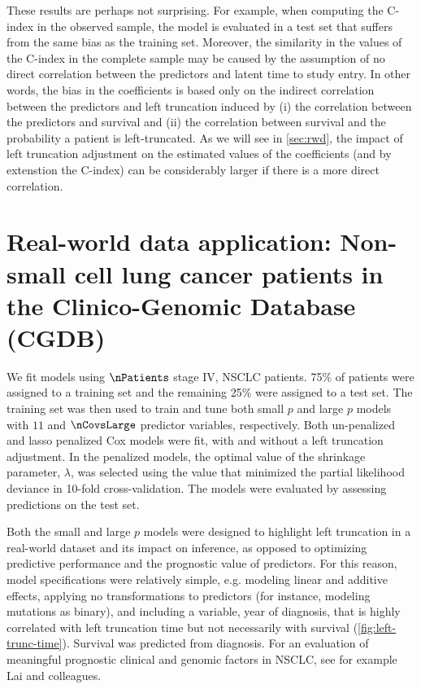 \documentclass[11pt,final,fleqn]{article}\usepackage[]{graphicx}\usepackage[]{color}
\theoremstyle{plain}
\begin{document}
These results are perhaps not surprising. For example, when computing the C-index in the observed sample, the model is evaluated in a test set that suffers from the same bias as the training set. Moreover, the similarity in the values of the C-index in the complete sample may be caused by the assumption of no direct correlation between the predictors and latent time to study entry. In other words, the bias in the coefficients is based only on the indirect correlation between the predictors and left truncation induced by (i) the correlation between the predictors and survival and (ii) the correlation between survival and the probability a patient is left-truncated. As we will see in \autoref{sec:rwd}, the impact of left truncation adjustment on the estimated values of the coefficients (and by extenstion the C-index) can be considerably larger if there is a more direct correlation. 

\section{Real-world data application: Non-small cell lung cancer patients in the Clinico-Genomic Database (CGDB)} \label{sec:rwd}
We fit models using $\nPatients$ stage IV, NSCLC patients. 75\%  of patients were assigned to a training set and the remaining 25\% were assigned to a test set. The training set was then used to train and tune both small $p$ and large $p$ models with $11$ and $\nCovsLarge$ predictor variables, respectively. Both un-penalized and lasso penalized Cox models were fit, with and without a left truncation adjustment. In the penalized models, the optimal value of the shrinkage parameter,  $\lambda$, was selected using the value that minimized the partial likelihood deviance in 10-fold cross-validation.  The models were evaluated by assessing predictions on the test set.

Both the small and large $p$ models were designed to highlight left truncation in a real-world dataset and its impact on inference, as opposed to optimizing predictive performance and the prognostic value of predictors. For this reason, model specifications were relatively simple, e.g. modeling linear and additive effects, applying no transformations to predictors (for instance, modeling mutations as binary), and including a variable, year of diagnosis, that is highly correlated with left truncation time but not necessarily with survival (\autoref{fig:left-trunc-time}). Survival was predicted from diagnosis. For an evaluation of meaningful prognostic clinical and genomic factors in NSCLC, see for example Lai and colleagues\cite{lai2020nsclc}.
\end{document}
